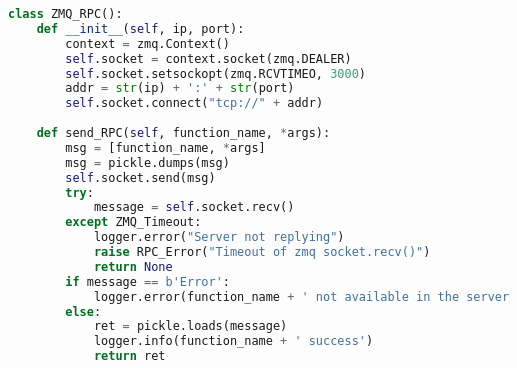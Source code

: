 \begin{lstlisting}[language=Python, 
                   caption = The code for basic RPC using ZeroMQ., 
                   label=cap:zmqrpc_client]
class ZMQ_RPC():                                                               
    def __init__(self, ip, port):                                              
        context = zmq.Context()                                                
        self.socket = context.socket(zmq.DEALER)                               
        self.socket.setsockopt(zmq.RCVTIMEO, 3000)                             
        addr = str(ip) + ':' + str(port)                                       
        self.socket.connect("tcp://" + addr)                                   
                                                                               
    def send_RPC(self, function_name, *args):                                  
        msg = [function_name, *args]                                           
        msg = pickle.dumps(msg)                                                
        self.socket.send(msg)                                                  
        try:                                                                   
            message = self.socket.recv()                                       
        except ZMQ_Timeout:                                                    
            logger.error("Server not replying")                                
            raise RPC_Error("Timeout of zmq socket.recv()")                    
            return None                                                        
        if message == b'Error':                                                
            logger.error(function_name + ' not available in the server')        
        else:                                                                  
            ret = pickle.loads(message)                                        
            logger.info(function_name + ' success')                            
            return ret  
\end{lstlisting}

